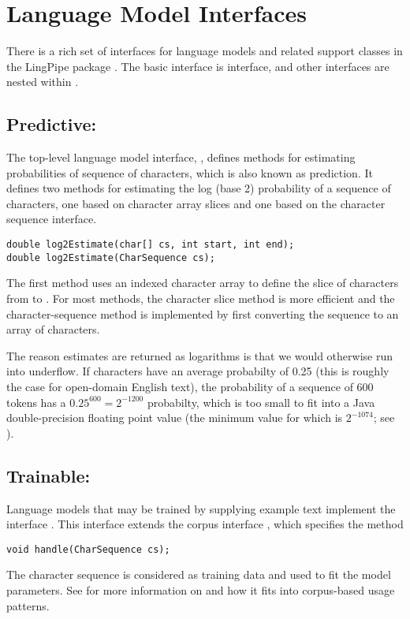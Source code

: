 \section{Language Model Interfaces}\label{section:char-lm-interfaces}

There is a rich set of interfaces for language models and related
support classes in the LingPipe package .  The
basic interface is  interface, and
other interfaces are nested within .

\subsection{Predictive: }

The top-level language model interface, , defines
methods for estimating probabilities of sequence of characters, which
is also known as prediction.  It defines two methods for estimating
the log (base 2) probability of a sequence of characters, one based on
character array slices and one based on the character sequence
interface.
%
\begin{verbatim}
double log2Estimate(char[] cs, int start, int end);
double log2Estimate(CharSequence cs);
\end{verbatim}
%
The first method uses an indexed character array to define the slice
of characters from  to .  For most
methods, the character slice method is more efficient and the
character-sequence method is implemented by first converting the
sequence to an array of characters.

The reason estimates are returned as logarithms is that we would
otherwise run into underflow.  If characters have an average
probabilty of 0.25 (this is roughly the case for open-domain English
text), the probability of a sequence of 600 tokens has a $0.25^{600} =
2^{-1200}$ probabilty, which is too small to fit into a Java
double-precision floating point value (the minimum value for which is
$2^{-1074}$; see ).

\subsection{Trainable: }

Language models that may be trained by supplying example text
implement the interface .  This interface
extends the corpus interface ,
which specifies the method
%
\begin{verbatim}
void handle(CharSequence cs);
\end{verbatim}
%
The character sequence is considered as training data and used to fit
the model parameters.  See  for more
information on  and how it fits into corpus-based
usage patterns.

